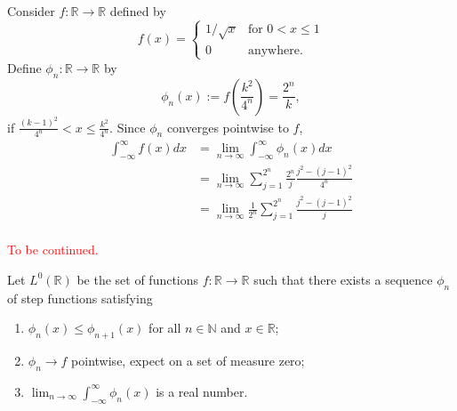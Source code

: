 \begin{exmp}{}{}
  Consider \(f \colon \mathbb{R} \to \mathbb{R}\) defined by \[
    f(x) =
	\begin{cases}
	  1/\sqrt{x} & \text{for }0 < x \leq 1 \\
	  0 & \text{anywhere.}
	\end{cases}
  \] 
  Define \(\phi_n\colon \mathbb{R} \to \mathbb{R}\) by \[\phi_n(x) :=
	f\left(\frac{k^2}{4^n}\right) = \frac{2^n}{k},
  \]
  if \(\frac{(k-1)^2}{4^n} < x \leq \frac{k^2}{4^n}\).
  Since \(\phi_n\) converges pointwise to \(f\), \begin{align*}
    \int_{-\infty}^\infty f(x) dx &= \lim_{n\to\infty} \int_{-\infty}^\infty \phi_n(x) dx \\
                                  &= \lim_{n\to\infty} \sum_{j=1}^{2^n} \frac{2^n}{j}\frac{j^2 - (j-1)^2}{4^n} \\
                                  &= \lim_{n\to\infty} \frac{1}{2^n} \sum_{j=1}^{2^n} \frac{j^2 - (j-1)^2}{j} \\
  \end{align*}

  \textcolor{red}{To be continued.}
\end{exmp}

\begin{defn}{}{}
  Let \(L^0(\mathbb{R})\) be the set of functions \(f\colon \mathbb{R} \to \mathbb{R}\) such that there exists a sequence \(\phi_n\) of step functions satisfying
  \begin{enumerate}
    \item \(\phi_n(x) \leq \phi_{n+1}(x)\) for all \(n \in \mathbb{N}\) and \(x \in \mathbb{R}\);
    \item \(\phi_n \to f\) pointwise, expect on a set of measure zero;
    \item \(\lim_{n\to\infty} \int_{-\infty}^\infty \phi_n(x)\) is a real number.
  \end{enumerate}
\end{defn}
